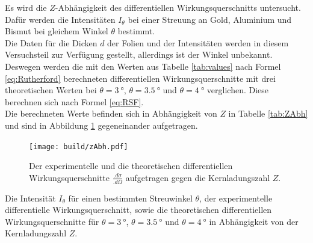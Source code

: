 Es wird die $Z$-Abhängigkeit des differentiellen Wirkungsquerschnitts untersucht. Dafür werden die Intensitäten $I_\theta$ bei einer Streuung an Gold, Aluminium und Bismut bei gleichem Winkel $\theta$ bestimmt.\\
Die Daten für die Dicken $d$ der Folien und der Intensitäten werden in diesem Versuchsteil zur Verfügung gestellt, allerdings ist der Winkel unbekannt. Deswegen werden die mit den Werten aus Tabelle \ref{tab:values} nach Formel \eqref{eq:Rutherford} berechneten differentiellen Wirkungsquerschnitte mit drei theoretischen Werten bei $\theta=\SI{3}{\degree}$, $\theta=\SI{3.5}{\degree}$ und $\theta=\SI{4}{\degree}$ verglichen. Diese berechnen sich nach Formel \eqref{eq:RSF}.\\
Die berechneten Werte befinden sich in Abhängigkeit von $Z$ in Tabelle \ref{tab:ZAbh} und sind in Abbildung \ref{fig:ZAbh} gegeneinander aufgetragen.\\

\begin{figure}
\centering
\texttt{[image: build/zAbh.pdf]}
\caption{Der experimentelle und die theoretischen differentiellen Wirkungsquerschnitte $\frac{.d\sigma}{.d\Omega}$ aufgetragen gegen die Kernladungszahl $Z$.}
\label{fig:ZAbh}
\end{figure}

\begin{table}
	\centering
	\caption{Die Intensität $I_\theta$ für einen bestimmten Streuwinkel $\theta$, der experimentelle differentielle Wirkungsquerschnitt, sowie die theoretischen differentiellen Wirkungsquerschnitte für $\theta=\SI{3}{\degree}$, $\theta=\SI{3,5}{\degree}$ und $\theta=\SI{4}{\degree}$ in Abhängigkeit von der Kernladungszahl $Z$.}
	
	\label{tab:ZAbh}
\end{table}
